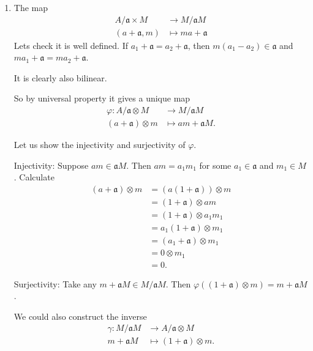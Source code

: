 \begin{exercise}{3}
\begin{enumerate}
        \item The map
            \begin{align*}
                A / \mathfrak{a} \times M &\rightarrow M / \mathfrak{a}M \\
                (a + \mathfrak{a}, m) &\mapsto m a + \mathfrak{a}
            \end{align*}
            Lets check it is well defined. If $a_1 + \mathfrak{a} = a_2 +
            \mathfrak{a}$, then $m (a_1 - a_2) \in \mathfrak{a}$ and $m a_1 +
            \mathfrak{a} = m a_2 + \mathfrak{a}$.

            It is clearly also bilinear.

            So by universal property it gives a unique map
            \begin{align*}
                \varphi \colon A / \mathfrak{a} \otimes M &\rightarrow M /
                \mathfrak{a}M \\
                (a + \mathfrak{a}) \otimes m &\mapsto a m + \mathfrak{a}M.
            \end{align*}

            Let us show the injectivity and surjectivity of $\varphi$.

            Injectivity: Suppose $a m \in \mathfrak{a}M$. Then $a m = a_1 m_1$
            for some $a_1 \in \mathfrak{a}$ and $m_1 \in M$. Calculate
            \begin{align*}
                (a + \mathfrak{a}) \otimes m &= (a(1 + \mathfrak{a})) \otimes m
                \\
                &= (1 + \mathfrak{a}) \otimes am \\
                &= (1 + \mathfrak{a}) \otimes a_1 m_1 \\
                &= a_1 (1 + \mathfrak{a}) \otimes m_1 \\
                &= (a_1 + \mathfrak{a}) \otimes m_1 \\
                &= 0 \otimes m_1 \\
                &= 0.
            \end{align*}

            Surjectivity:
            Take any $m + \mathfrak{a}M \in M/\mathfrak{a}M$. Then $\varphi((1 +
            \mathfrak{a}) \otimes m) = m + \mathfrak{a}M$.

            We could also construct the inverse
            \begin{align*}
                \gamma \colon M/\mathfrak{a}M &\rightarrow A/\mathfrak{a}
                \otimes M \\
                m + \mathfrak{a}M &\mapsto (1 + \mathfrak{a}) \otimes m.
            \end{align*}
    \end{enumerate}
\end{exercise}


